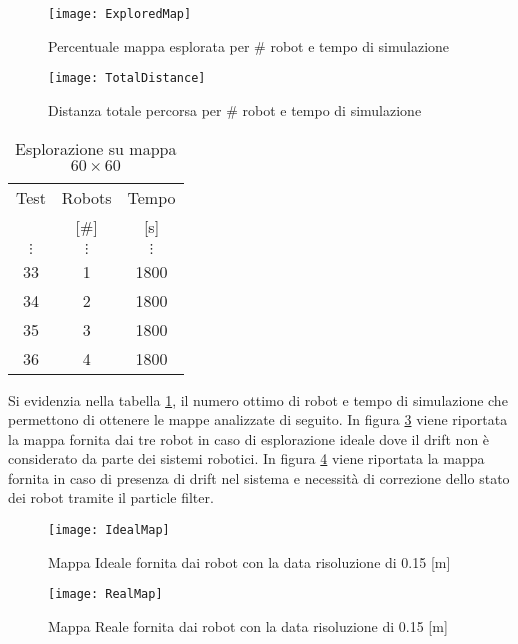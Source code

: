 \begin{figure}[htb]
	\centering
	\texttt{[image: ExploredMap]}
	\caption{Percentuale mappa esplorata per \# robot e tempo di simulazione}
	\label{fig:ExploredMap}
\end{figure}
%
\begin{figure}[htb]
	\centering
	\texttt{[image: TotalDistance]}
	\caption{Distanza totale percorsa per \# robot e tempo di simulazione}
	\label{fig:TotalDistance}
\end{figure}
\begin{table}[htb]
	\centering
	\caption{Esplorazione su mappa $60 \times 60$}
	\label{tab:optimalresults}
	\begin{tabular}{ccc}
	\toprule
	Test 		& 	Robots		&		Tempo\\
				&	[\#]			&		[\si{\second}]\\
	\midrule
								$\vdots$ & 	$\vdots$ & 	$\vdots$\\
      								33    &		1	 	& 1800\\
		 							34	& 		2 		& 1800\\
	\rowcolor[gray]{.9} 	35	& 		3 		& 1800\\
									36 	& 		4 		& 1800\\
     \bottomrule
\end{tabular}
\end{table}
%
\noindent 
Si evidenzia nella tabella \ref{tab:optimalresults}, il numero ottimo di robot 
e tempo di simulazione che permettono di ottenere le mappe analizzate di seguito.
In figura \ref{fig:IdealMap} viene riportata la mappa fornita dai tre robot in
caso di esplorazione ideale dove il drift non è considerato da parte dei sistemi
robotici.
In figura \ref{fig:RealMap} viene riportata la mappa fornita in caso di presenza
di drift nel sistema e necessità di correzione dello stato dei robot tramite il
particle filter.
\begin{figure}[htb]
	\centering
	\texttt{[image: IdealMap]}
	\caption{Mappa Ideale fornita dai robot con la data risoluzione di 0.15 [m]}
\label{fig:IdealMap}
\end{figure}

\begin{figure}[!htb]
	\centering
	\texttt{[image: RealMap]}
	\caption{Mappa Reale fornita dai robot con la data risoluzione di 0.15 [m] }
\label{fig:RealMap}
\end{figure}
